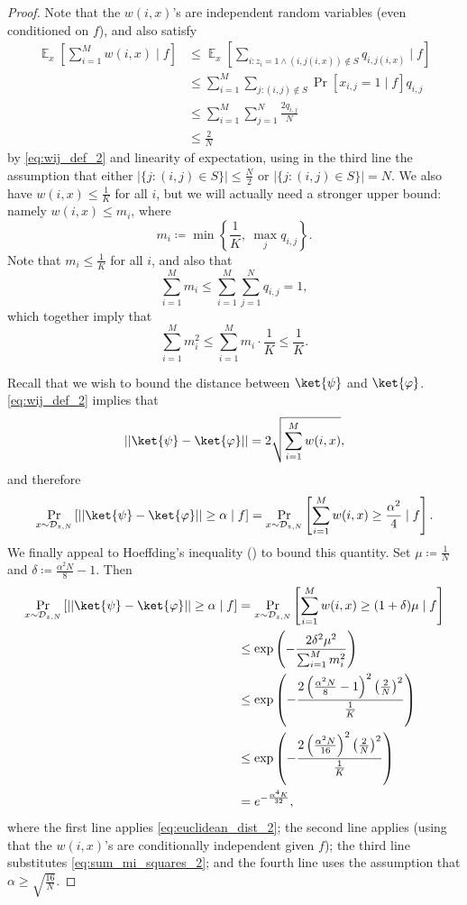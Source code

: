 \documentclass[11pt]{article}%
\newcommand{\E}{\mathop{\mathbb{E}}}
\begin{document}
\begin{proof}
Note that the $w(i,x)$'s are independent random variables (even conditioned on $f$), and also satisfy
\begin{align*}
\E_x \left[\sum_{i=1}^M w(i,x) \mid f\right] &\le \E_x \left[\sum_{i: z_i = 1 \land (i, j(i, x)) \not\in S} q_{i,j(i,x)} \mid f \right]\\
&\le \sum_{i=1}^M \sum_{j : (i, j) \not\in S} \Pr[x_{i,j} = 1 \mid f]q_{i,j}\\
&\le \sum_{i=1}^M \sum_{j=1}^N \frac{2q_{i,j}}{N}\\
&\le \frac{2}{N}
\end{align*}
by \eqref{eq:wij_def_2} and linearity of expectation, using in the third line the assumption that either $|\{j: (i, j) \in S\}| \le \frac{N}{2}$ or $|\{j: (i, j) \in S\}| = N$. We also have $w(i, x) \le \frac{1}{K}$ for all $i$, but we will actually need a stronger upper bound: namely $w(i, x) \le m_i$, where
\[
m_i \coloneqq \min\left\{\frac{1}{K},\ \max_j q_{i,j}\right\}.
\]
Note that $m_i \le \frac{1}{K}$ for all $i$, and also that
\[
\sum_{i=1}^M m_i \le \sum_{i=1}^M \sum_{j=1}^N q_{i,j} = 1,
\]
which together imply that
\begin{equation}
\label{eq:sum_mi_squares_2}
\sum_{i=1}^M m_i^2 \le \sum_{i=1}^M m_i \cdot \frac{1}{K} \le \frac{1}{K}.
\end{equation}

Recall that we wish to bound the distance between $\ket{\psi}$ and $\ket{\varphi}$. \eqref{eq:wij_def_2} implies that
\begin{equation}
|| \ket{\psi} - \ket{\varphi}|| = 2\sqrt{\sum_{i=1}^M w(i,x)},
\label{eq:euclidean_dist_2}
\end{equation}
and therefore
\[
\Pr_{x \sim \mathcal{D}_{z,N}} \left[|| \ket{\psi} - \ket{\varphi}|| \ge \alpha \mid f\right]
= \Pr_{x \sim \mathcal{D}_{z,N}} \left[\sum_{i=1}^M w(i,x) \ge \frac{\alpha^2}{4} \mid f \right].
\]
We finally appeal to Hoeffding's inequality () to bound this quantity. Set $\mu \coloneqq \frac{1}{N}$ and $\delta \coloneqq \frac{\alpha^2 N}{8} - 1$. Then
\begin{align*}
\Pr_{x \sim \mathcal{D}_{z,N}} \left[|| \ket{\psi} - \ket{\varphi}|| \ge \alpha \mid f\right]
&= \Pr_{x \sim \mathcal{D}_{z,N}} \left[\sum_{i=1}^M w(i,x) \ge (1 + \delta)\mu \mid f \right]\\
&\le \exp\left(-\frac{2\delta^2 \mu^2}{\sum_{i=1}^M m_i^2} \right)\\
&\le \exp\left(-\frac{2\left(\frac{\alpha^2N}{8} - 1\right)^2 \left(\frac{2}{N}\right)^2}{\frac{1}{K}} \right)\\
&\le \exp\left(-\frac{2\left(\frac{\alpha^2N}{16}\right)^2 \left(\frac{2}{N}\right)^2}{\frac{1}{K}} \right)\\
&= e^{-\frac{\alpha^4 K}{32}},
\end{align*}
where the first line applies \eqref{eq:euclidean_dist_2}; the second line applies  (using that the $w(i,x)$'s are conditionally independent given $f$); the third line substitutes \eqref{eq:sum_mi_squares_2}; and the fourth line uses the assumption that $\alpha \ge \sqrt{\frac{16}{N}}$.
\end{proof}
\end{document}
